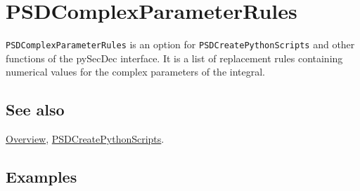 \documentclass[../FeynHelpersManual.tex]{subfiles}
\begin{document}
\hypertarget{psdcomplexparameterrules}{
\section{PSDComplexParameterRules}\label{psdcomplexparameterrules}}

\texttt{PSDComplexParameterRules} is an option for
\texttt{PSDCreatePythonScripts} and other functions of the pySecDec
interface. It is a list of replacement rules containing numerical values
for the complex parameters of the integral.

\subsection{See also}

\hyperlink{toc}{Overview},
\hyperlink{psdcreatepythonscripts}{PSDCreatePythonScripts}.

\subsection{Examples}
\end{document}

